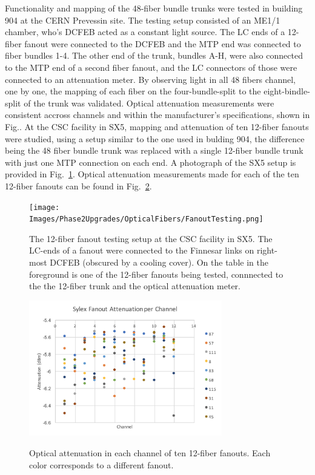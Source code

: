 Functionality and mapping of the 48-fiber bundle trunks were tested in building 904 at the CERN Prevessin site. The testing setup consisted of an ME1/1 chamber, who's DCFEB acted as a constant light source. The LC ends of a 12-fiber fanout were connected to the DCFEB and the MTP end was connected to fiber bundles 1-4. The other end of the trunk, bundles A-H, were also connected to the MTP end of a second fiber fanout, and the LC connectors of those were connected to an attenuation meter. By observing light in all 48 fibers channel, one by one, the mapping of each fiber on the four-bundle-split to the eight-bindle-split of the trunk was validated. Optical attenuation measurements were consistent accross channels and within the manufacturer's specifications, shown in Fig.. At the CSC facility in SX5, mapping and attenuation of ten 12-fiber fanouts were studied, using a setup similar to the one used in bulding 904, the difference being the 48 fiber bundle trunk was replaced with a single 12-fiber bundle trunk with just one MTP connection on each end. A photograph of the SX5 setup is provided in Fig.~\ref{fig:fibertestsetup}. Optical attenuation measurements made for each of the ten 12-fiber fanouts can be found in Fig.~\ref{fig:fanoutattenuation}.

\begin{figure}[H]
    \centering
    {\texttt{[image: Images/Phase2Upgrades/OpticalFibers/FanoutTesting.png]}}
    \caption{The 12-fiber fanout testing setup at the CSC facility in SX5. The LC-ends of a fanout were connected to the Finnesar links on right-most DCFEB (obscured by a cooling cover). On the table in the foreground is one of the 12-fiber fanouts being tested, connnected to the the 12-fiber trunk and the optical attenuation meter.}
    \label{fig:fibertestsetup}
\end{figure}

\begin{figure}[H]
    \centering
    {\includegraphics[width=0.75\textwidth]{Images/Phase2Upgrades/OpticalFibers/FanoutAttenuation.png}}
    \caption{Optical attenuation in each channel of ten 12-fiber fanouts. Each color corresponds to a different fanout.}
    \label{fig:fanoutattenuation}
\end{figure}

